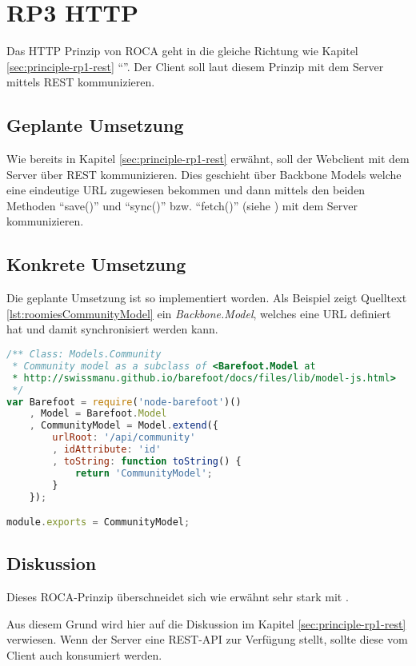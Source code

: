 \section{RP3 HTTP}
\label{sec:principle-rp3-http}

Das HTTP Prinzip von ROCA geht in die gleiche Richtung wie Kapitel \ref{sec:principle-rp1-rest} ``''.
Der Client soll laut diesem Prinzip mit dem Server mittels REST kommunizieren.

\subsection*{Geplante Umsetzung}
Wie bereits in Kapitel \ref{sec:principle-rp1-rest} erwähnt, soll der Webclient mit dem Server über REST kommunizieren.
Dies geschieht über Backbone Models welche eine eindeutige \gls{URL} zugewiesen bekommen und dann mittels den beiden Methoden ``save()'' und ``sync()'' bzw. ``fetch()'' (siehe \cite{BackboneSync}) mit dem Server kommunizieren.


\subsection*{Konkrete Umsetzung}
Die geplante Umsetzung ist so implementiert worden. Als Beispiel zeigt Quelltext \ref{lst:roomiesCommunityModel} ein \emph{Backbone.Model}, welches eine URL definiert hat und damit synchronisiert werden kann.

\begin{lstlisting}[language=JavaScript, caption=Community Model \cite{roomiesCommunityModel}, label=lst:roomiesCommunityModel]
/** Class: Models.Community
 * Community model as a subclass of <Barefoot.Model at
 * http://swissmanu.github.io/barefoot/docs/files/lib/model-js.html>
 */
var Barefoot = require('node-barefoot')()
	, Model = Barefoot.Model
	, CommunityModel = Model.extend({
		urlRoot: '/api/community'
		, idAttribute: 'id'
		, toString: function toString() {
			return 'CommunityModel';
		}
	});

module.exports = CommunityModel;
\end{lstlisting}

\subsection*{Diskussion}
Dieses ROCA-Prinzip überschneidet sich wie erwähnt sehr stark mit .

Aus diesem Grund wird hier auf die Diskussion im Kapitel \ref{sec:principle-rp1-rest} verwiesen. Wenn der Server eine REST-API zur Verfügung stellt, sollte diese vom Client auch konsumiert werden.